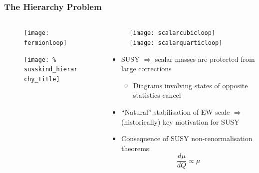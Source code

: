 \documentclass[10pt,aspectratio=169]{beamer}
\begin{document}
\begin{frame}
  \frametitle{The Hierarchy Problem}
  \begin{columns}[t]
    \begin{column}{0.5\textwidth}
      \vspace{-15pt}
      \begin{figure}
        \texttt{[image: fermionloop]}
      \end{figure}
      \vspace{-15pt}
      \begin{figure}
        \centering
        \texttt{[image: \%
          susskind\_hierarchy\_title]}
      \end{figure}
      \vspace*{-15pt}
      \begin{center}
      \end{center}
    \end{column}
    \begin{column}{0.5\textwidth}
      \begin{figure}
        \centering
        \texttt{[image: scalarcubicloop]}
        \texttt{[image: scalarquarticloop]}
      \end{figure}
      \begin{itemize} \itemsep1em
      \item {\color{blue} SUSY $\Rightarrow$ scalar masses are protected
        from large corrections}
        \begin{itemize}\itemsep0.5em
        \item Diagrams involving states of opposite
          statistics cancel
        \end{itemize}
      \item ``Natural'' stabilisation of EW scale $\Rightarrow$ (historically)
        key motivation for SUSY
      \item Consequence of {\color{blue} SUSY non-renormalisation theorems:}
        \begin{equation*}
          \frac{d\mu}{d Q} \propto \mu
        \end{equation*}
      \end{itemize}
    \end{column}
  \end{columns}
\end{frame}
\end{document}
